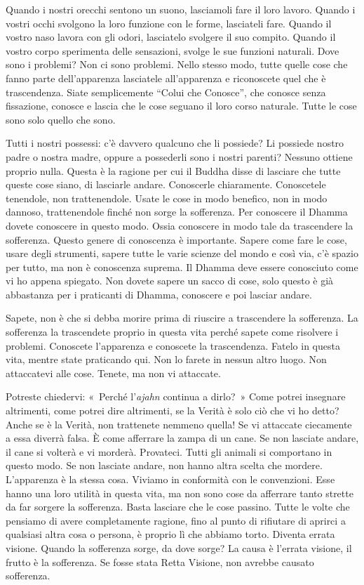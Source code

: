 Quando i nostri orecchi sentono un suono, lasciamoli fare il loro
lavoro. Quando i vostri occhi svolgono la loro funzione con le forme,
lasciateli fare. Quando il vostro naso lavora con gli odori, lasciatelo
svolgere il suo compito. Quando il vostro corpo sperimenta delle
sensazioni, svolge le sue funzioni naturali. Dove sono i problemi? Non
ci sono problemi. Nello stesso modo, tutte quelle cose che fanno parte
dell'apparenza lasciatele all'apparenza e riconoscete quel che è
trascendenza. Siate semplicemente ``Colui che Conosce'', che conosce
senza fissazione, conosce e lascia che le cose seguano il loro corso
naturale. Tutte le cose sono solo quello che sono.

Tutti i nostri possessi: c'è davvero qualcuno che li possiede? Li
possiede nostro padre o nostra madre, oppure a possederli sono i nostri
parenti? Nessuno ottiene proprio nulla. Questa è la ragione per cui il
Buddha disse di lasciare che tutte queste cose siano, di lasciarle
andare. Conoscerle chiaramente. Conoscetele tenendole, non
trattenendole. Usate le cose in modo benefico, non in modo dannoso,
trattenendole finché non sorge la sofferenza. Per conoscere il Dhamma
dovete conoscere in questo modo. Ossia conoscere in modo tale da
trascendere la sofferenza. Questo genere di conoscenza è importante.
Sapere come fare le cose, usare degli strumenti, sapere tutte le varie
scienze del mondo e così via, c'è spazio per tutto, ma non è conoscenza
suprema. Il Dhamma deve essere conosciuto come vi ho appena spiegato.
Non dovete sapere un sacco di cose, solo questo è già abbastanza per i
praticanti di Dhamma, conoscere e poi lasciar andare.

Sapete, non è che si debba morire prima di riuscire a trascendere la
sofferenza. La sofferenza la trascendete proprio in questa vita perché
sapete come risolvere i problemi. Conoscete l'apparenza e conoscete la
trascendenza. Fatelo in questa vita, mentre state praticando qui. Non lo
farete in nessun altro luogo. Non attaccatevi alle cose. Tenete, ma non
vi attaccate.

Potreste chiedervi: «~Perché l'\emph{ajahn} continua a dirlo?~» Come
potrei insegnare altrimenti, come potrei dire altrimenti, se la Verità è
solo ciò che vi ho detto? Anche se è la Verità, non trattenete nemmeno
quella! Se vi attaccate ciecamente a essa diverrà falsa. È come
afferrare la zampa di un cane. Se non lasciate andare, il cane si
volterà e vi morderà. Provateci. Tutti gli animali si comportano in
questo modo. Se non lasciate andare, non hanno altra scelta che mordere.
L'apparenza è la stessa cosa. Viviamo in conformità con le convenzioni.
Esse hanno una loro utilità in questa vita, ma non sono cose da
afferrare tanto strette da far sorgere la sofferenza. Basta lasciare che
le cose passino. Tutte le volte che pensiamo di avere completamente
ragione, fino al punto di rifiutare di aprirci a qualsiasi altra cosa o
persona, è proprio lì che abbiamo torto. Diventa errata visione. Quando
la sofferenza sorge, da dove sorge? La causa è l'errata visione, il
frutto è la sofferenza. Se fosse stata Retta Visione, non avrebbe
causato sofferenza.

